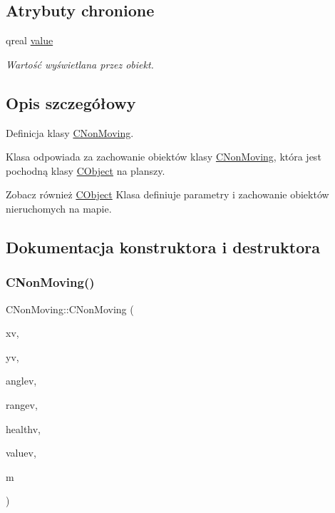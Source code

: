 \subsection*{Atrybuty chronione}
\begin{DoxyCompactItemize}
\item 
qreal \mbox{\hyperlink{class_c_non_moving_a822c4674c5e6d53b11bf135f5d2d42bd}{value}}
\begin{DoxyCompactList}\small\item\em Wartość wyświetlana przez obiekt. \end{DoxyCompactList}\end{DoxyCompactItemize}


\subsection{Opis szczegółowy}
Definicja klasy \mbox{\hyperlink{class_c_non_moving}{C\+Non\+Moving}}. 

Klasa odpowiada za zachowanie obiektów klasy \mbox{\hyperlink{class_c_non_moving}{C\+Non\+Moving}}, która jest pochodną klasy \mbox{\hyperlink{class_c_object}{C\+Object}} na planszy. \begin{DoxySeeAlso}{Zobacz również}
\mbox{\hyperlink{class_c_object}{C\+Object}} Klasa definiuje parametry i zachowanie obiektów nieruchomych na mapie. 
\end{DoxySeeAlso}


\subsection{Dokumentacja konstruktora i destruktora}
\mbox{\label{class_c_non_moving_a4f1dd301f116c087e277f431480bd088}} 
\subsubsection{\texorpdfstring{C\+Non\+Moving()}{CNonMoving()}}
{\footnotesize\ttfamily C\+Non\+Moving\+::\+C\+Non\+Moving (\begin{DoxyParamCaption}\item[{qreal}]{xv,  }\item[{qreal}]{yv,  }\item[{qreal}]{anglev,  }\item[{qreal}]{rangev,  }\item[{qreal}]{healthv,  }\item[{qreal}]{valuev,  }\item[{\mbox{\hyperlink{class_c_map}{C\+Map}} $\ast$}]{m }\end{DoxyParamCaption})}




